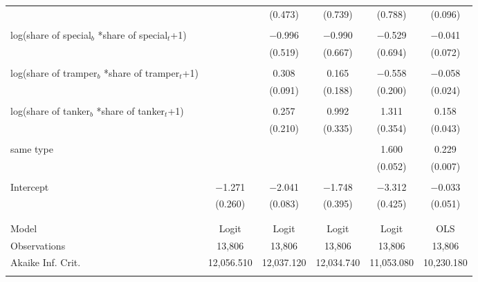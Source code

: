\begin{tabular}{@{\extracolsep{5pt}}lccccc}
  &  & (0.473) & (0.739) & (0.788) & (0.096) \\ 
  & & & & & \\ 
 log(share of special$_{b}$ *share of special$_{t}$+1) &  & $-$0.996 & $-$0.990 & $-$0.529 & $-$0.041 \\ 
  &  & (0.519) & (0.667) & (0.694) & (0.072) \\ 
  & & & & & \\ 
 log(share of tramper$_{b}$ *share of tramper$_{t}$+1) &  & 0.308 & 0.165 & $-$0.558 & $-$0.058 \\ 
  &  & (0.091) & (0.188) & (0.200) & (0.024) \\ 
  & & & & & \\ 
 log(share of tanker$_{b}$ *share of tanker$_{t}$+1) &  & 0.257 & 0.992 & 1.311 & 0.158 \\ 
  &  & (0.210) & (0.335) & (0.354) & (0.043) \\ 
  & & & & & \\ 
 same type &  &  &  & 1.600 & 0.229 \\ 
  &  &  &  & (0.052) & (0.007) \\ 
  & & & & & \\ 
 Intercept & $-$1.271 & $-$2.041 & $-$1.748 & $-$3.312 & $-$0.033 \\ 
  & (0.260) & (0.083) & (0.395) & (0.425) & (0.051) \\ 
  & & & & & \\ 
\hline \\[-1.8ex] 
Model & Logit & Logit & Logit & Logit & OLS \\ 
Observations & 13,806 & 13,806 & 13,806 & 13,806 & 13,806 \\ 
Akaike Inf. Crit. & 12,056.510 & 12,037.120 & 12,034.740 & 11,053.080 & 10,230.180 \\ 
\hline 
\hline \\[-1.8ex] 
\end{tabular} 
